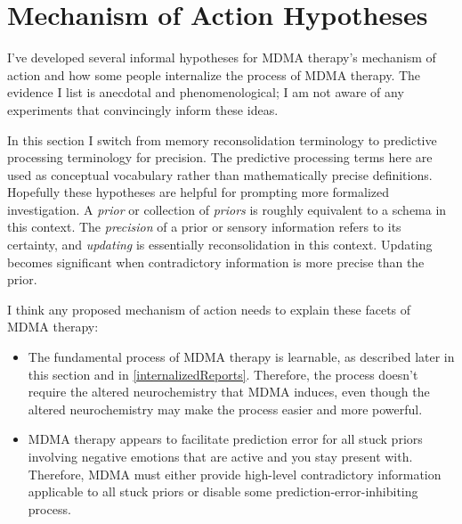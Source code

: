 \documentclass[11pt,oneside]{book}
\begin{document}
\chapter{Mechanism of Action Hypotheses}
\label{ppHypotheses}
I've developed several informal hypotheses for MDMA therapy's mechanism of action and how some people internalize the process of MDMA therapy. The evidence I list is anecdotal and phenomenological; I am not aware of any experiments that convincingly inform these ideas.

In this section I switch from memory reconsolidation terminology to predictive processing terminology for precision. The predictive processing terms here are used as conceptual vocabulary rather than mathematically precise definitions. Hopefully these hypotheses are helpful for prompting more formalized investigation. A \textit{prior} or collection of \textit{priors} is roughly equivalent to a schema in this context. The \textit{precision} of a prior or sensory information refers to its certainty, and \textit{updating} is essentially reconsolidation in this context. Updating becomes significant when contradictory information is more precise than the prior.

I think any proposed mechanism of action needs to explain these facets of MDMA therapy:
\begin{itemize}
    \item The fundamental process of MDMA therapy is learnable, as described later in this section and in \cref{internalizedReports}. Therefore, the process doesn't require the altered neurochemistry that MDMA induces, even though the altered neurochemistry may make the process easier and more powerful.
    \item MDMA therapy appears to facilitate prediction error for all stuck priors involving negative emotions that are active and you stay present with. Therefore, MDMA must either provide high-level contradictory information applicable to all stuck priors or disable some prediction-error-inhibiting process.
\end{itemize}
\end{document}
